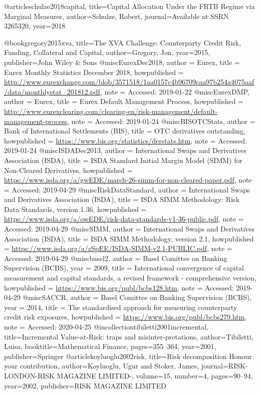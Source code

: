 @article{schulze2018capital,
  title={Capital Allocation Under the FRTB Regime via Marginal Measures},
  author={Schulze, Robert},
  journal={Available at SSRN 3265320},
  year={2018}
}

@book{gregory2015xva,
  title={The XVA Challenge: Counterparty Credit Risk, Funding, Collateral and Capital},
  author={Gregory, Jon},
  year={2015},
  publisher={John Wiley \& Sons}
}
@misc{EurexDec2018,
  author = {Eurex},
  title = {{Eurex Monthly Statistics December 2018}},
  howpublished = {\url{http://www.eurexchange.com/blob/3571518/1aa0157c4b96709caa97b254a4075aaf/data/monthlystat_201812.pdf}},
  note = {Accessed: 2019-01-22}
}
@misc{EurexDMP,
  author = {Eurex},
  title = {{Eurex Default Management Process}},
  howpublished = {\url{http://www.eurexclearing.com/clearing-en/risk-management/default-management-process}},
  note = {Accessed: 2019-01-24}
}
@misc{BISOTCStats,
  author = {Bank of International Settlements (BIS)},
  title = {{OTC derivatives outstanding}},
  howpublished = {\url{https://www.bis.org/statistics/derstats.htm}},
  note = {Accessed: 2019-01-24}
}
@misc{ISDADec2013,
  author = {International Swaps and Derivatives Association (ISDA)},
  title = {{ISDA Standard Initial Margin Model (SIMM\texttrademark) for Non-Cleared Derivatives}},
  howpublished = {\url{https://www.isda.org/a/gwEDE/march-26-simm-for-non-cleared-paper.pdf}},
  note = {Accessed: 2019-04-29}
}
@misc{RiskDataStandard,
  author = {International Swaps and Derivatives Association (ISDA)},  
  title = {{ISDA SIMM{\texttrademark} Methodology: Risk Data Standards, version 1.36}},
  howpublished = {\url{https://www.isda.org/a/owEDE/risk-data-standards-v1-36-public.pdf}},
  note = {Accessed: 2019-04-29}
}
@misc{SIMM,
  author = {International Swaps and Derivatives Association (ISDA)},
  title = {{ISDA SIMM{\texttrademark} Methodology, version 2.1}},
  howpublished = {\url{https://www.isda.org/a/zSpEE/ISDA-SIMM-v2.1-PUBLIC.pdf}},
  note = {Accessed: 2019-04-29}
}
@misc{basel2,
  author = {Basel Comittee on Banking Supervision (BCBS)},
  year = {2009},
  title = {{International convergence of capital measurement and capital standards, a revised framework - comprehensive version}},
  howpublished = {\url{https://www.bis.org/publ/bcbs128.htm}},
  note = {Accessed: 2019-04-29}
}
@misc{SACCR,
  author = {Basel Comittee on Banking Supervision (BCBS)},
  year = {2014},
  title = {{The standardised approach for measuring counterparty credit risk exposures}},
  howpublished = {\url{https://www.bis.org/publ/bcbs279.htm}},
  note = {Accessed: 2020-04-25}
}
@incollection{tibiletti2001incremental,
  title={Incremental Value-at-Risk: traps and misinter-pretations},
  author={Tibiletti, Luisa},
  booktitle={Mathematical Finance},
  pages={355--364},
  year={2001},
  publisher={Springer}
}
@article{koyluoglu2002risk,
  title={Risk decomposition Honour your contribution},
  author={Koyluoglu, Ugur and Stoker, James},
  journal={RISK-LONDON-RISK MAGAZINE LIMITED-},
  volume={15},
  number={4},
  pages={90--94},
  year={2002},
  publisher={RISK MAGAZINE LIMITED}
}
